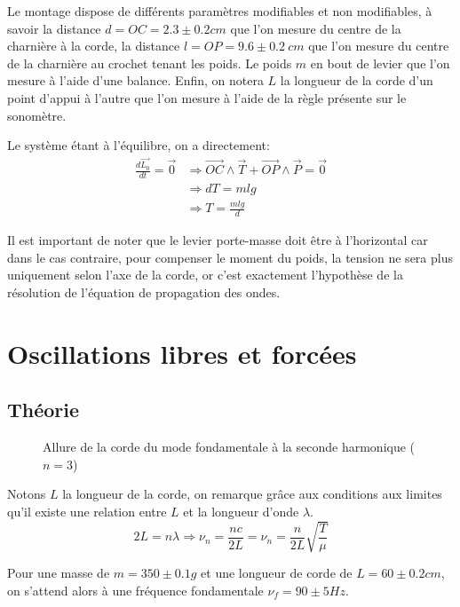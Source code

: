 \documentclass[12pt]{article}
\begin{document}
Le montage dispose de différents paramètres modifiables et non modifiables, à savoir la distance $d=OC=2.3 \pm 0.2 cm$ que l'on mesure du centre de la charnière à la corde, la distance $l=OP=9.6 \pm 0.2 \ cm$ que l'on mesure
du centre de la charnière au crochet tenant les poids. Le poids $m$ en bout de levier que l'on mesure à l'aide d'une balance. Enfin, on notera $L$ la longueur de la corde d'un point d'appui à l'autre que
l'on mesure à l'aide de la règle présente sur le sonomètre.

Le système étant à l'équilibre, on a directement:
\begin{align*}
    \frac{d \vec{L_0}}{dt} = \vec{0} & \Rightarrow \vec{OC} \wedge \vec{T} + \vec{OP} \wedge \vec{P} = \vec{0} \\
    & \Rightarrow dT = mlg \\
    & \Rightarrow T = \frac{mlg}{d}
\end{align*}

Il est important de noter que le levier porte-masse doit être à l'horizontal car dans le cas contraire, pour compenser le moment du poids, la tension ne sera plus
uniquement selon l'axe de la corde, or c'est exactement l'hypothèse de la résolution de l'équation de propagation des ondes. 

\break
\section{Oscillations libres et forcées}
\subsection{Théorie}
\begin{figure}[!h]
    \begin{center}
        \resizebox{0.8\textwidth}{3.2cm}{
            
        }
    \end{center}
    \caption{Allure de la corde du mode fondamentale à la seconde harmonique ($n=3$)}
    \label{fig:mode_fonda}
\end{figure}

Notons $L$ la longueur de la corde, on remarque grâce aux conditions aux limites qu'il existe une relation entre $L$ et la longueur d'onde $\lambda$.
\begin{equation}
    2L = n\lambda \Rightarrow \nu_n = \frac{nc}{2L} = \nu_n = \frac{n}{2L}\sqrt{\frac{T}{\mu}}
\end{equation}

Pour une masse de $m=350 \pm 0.1g$ et une longueur de corde de $L=60 \pm 0.2cm$, on s'attend alors à une fréquence fondamentale $\nu_f = 90 \pm 5 Hz$.
\end{document}
